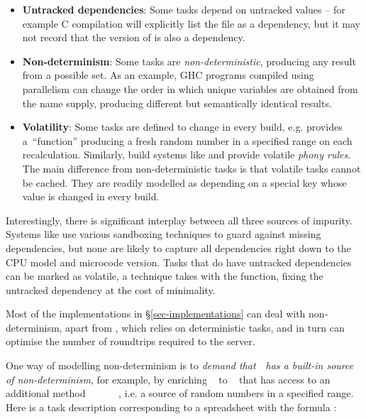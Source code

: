 \begin{itemize}
\item \textbf{Untracked dependencies}: Some tasks depend on untracked values --
      for example C compilation will explicitly list the  file as
      a dependency, but it may not record that the version of  is also
      a dependency.

\item \textbf{Non-determinism}: Some tasks are \emph{non-deterministic},
      producing any result from a possible set. As an example, GHC programs
      compiled using parallelism can change the order in which unique variables
      are obtained from the name supply, producing different but semantically
      identical results.

\item \textbf{Volatility}: Some tasks are defined to change in every build, e.g.
      \Excel provides a~``function''  producing a fresh random
      number in a specified range on each recalculation. Similarly, build
      systems like \Make and \Shake provide volatile \emph{phony rules}. The
      main difference from non-deterministic tasks is that volatile tasks cannot
      be cached. They are readily modelled as depending on a special key
       whose value is changed in every build.
\end{itemize}

Interestingly, there is significant interplay between all three sources of
impurity. Systems like \Bazel use various sandboxing techniques to guard against
missing dependencies, but none are likely to capture all dependencies right down
to the CPU model and microcode version. Tasks that do have untracked
dependencies can be marked as volatile, a technique \Excel takes with the
 function, fixing the untracked dependency at the cost of
minimality.

Most of the implementations in \S\ref{sec-implementations} can deal with
non-determinism, apart from \Buck, which relies on deterministic tasks, and
in turn can optimise the number of roundtrips required to the server.

One way of modelling non-determinism is to \emph{demand that}~~\emph{has a
built-in source of non-determinism}, for example, by enriching
~ to ~ that has access to an
additional method
~\hs{::}~~~\hs{->}~~,
i.e. a source of random numbers in a specified range. Here is a task description
corresponding to a spreadsheet with the formula :

